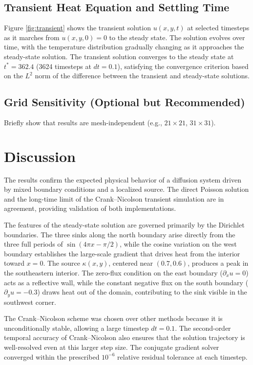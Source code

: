 \documentclass[
  aapm,
  amsmath,amssymb,
  reprint,          %
  floatfix
]{revtex4-2}
\begin{document}
\subsection{Transient Heat Equation and Settling Time}

Figure \ref{fig:transient} shows the transient solution $u(x,y,t)$ at selected timesteps as 
it marches from $u(x,y,0) = 0$ to the steady state. The solution evolves over time, 
with the temperature distribution gradually changing as it approaches the steady-state solution. 
The transient solution converges to the steady state at $t^* = 362.4$ 
(3624 timesteps at $dt = 0.1$), satisfying the convergence criterion based on the $L^2$ norm 
of the difference between the transient and steady-state solutions.

\subsection{Grid Sensitivity (Optional but Recommended)}
Briefly show that results are mesh-independent (e.g., $21\times 21$, $31\times 31$).

\section{Discussion}

The results confirm the expected physical behavior of a diffusion system driven by mixed
boundary conditions and a localized source. The direct Poisson solution and the long-time
limit of the Crank--Nicolson transient simulation are in agreement, providing
validation of both implementations.

The features of the steady-state solution are governed primarily by the Dirichlet
boundaries. The three sinks along the north boundary arise directly from the three full
periods of $\sin(4\pi x - \pi/2)$, while the cosine variation on the
west boundary establishes the large-scale gradient that drives heat from the interior
toward $x = 0$. The source $\kappa(x,y)$, centered near $(0.7, 0.6)$, produces
a peak in the southeastern interior. The zero-flux condition on the east
boundary ($\partial_x u = 0$) acts as a reflective wall,
while the constant negative flux on the south boundary ($\partial_y u = -0.3$) draws heat
out of the domain, contributing to the sink visible in the southwest corner.

The Crank--Nicolson scheme was chosen over other methods because it is
unconditionally stable, allowing a large timestep $dt = 0.1$.
The second-order temporal accuracy of Crank--Nicolson also ensures that the solution
trajectory is well-resolved even at this larger step size.
The conjugate gradient solver converged within the prescribed $10^{-6}$ relative
residual tolerance at each timestep.
\end{document}
